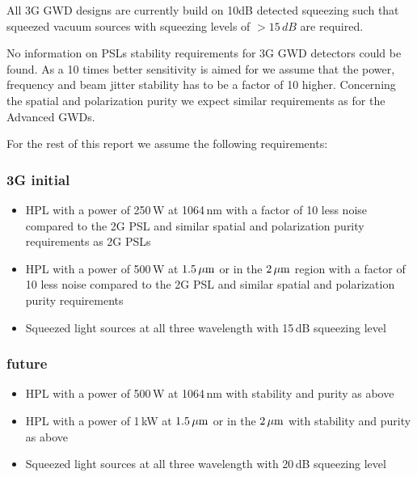 All 3G GWD designs are currently build on 10dB detected squeezing such that squeezed vacuum sources with squeezing levels of $> 15\,dB$ are required. 

No information on PSLs stability requirements for 3G GWD detectors could be found. As a 10 times better sensitivity is aimed for we assume that the power, frequency and beam jitter stability has to be a factor of 10 higher. Concerning the spatial and polarization purity we expect similar requirements as for the Advanced GWDs.

For the rest of this report we assume the following requirements:

\subsubsection{3G initial}
\begin{itemize}
	\item HPL with a power of 250\,W at 1064\,nm with a factor of 10 less noise compared to the 2G PSL and similar spatial and polarization purity requirements as 2G PSLs
	\item HPL with a power of 500\,W at  $ 1.5\, {\rm \mu m}$ or in the $ 2\, {\rm \mu m}$ region with a factor of 10 less noise compared to the 2G PSL and similar spatial and polarization purity requirements
	\item Squeezed light sources at all three wavelength with 15\,dB squeezing level
\end{itemize}
\subsubsection{future}
\begin{itemize}
	\item HPL with a power of 500\,W at 1064\,nm with stability and purity as above
	\item HPL with a power of 1\,kW at  $ 1.5\, {\rm \mu m}$ or in the $ 2\, {\rm \mu m}$ with stability and purity as above
	\item Squeezed light sources at all three wavelength with 20\,dB squeezing level
\end{itemize}


